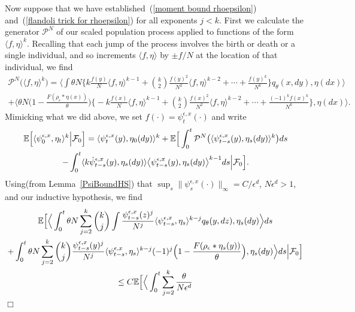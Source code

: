 \documentclass[12pt]{article}
\newenvironment {proof}{{\noindent\bf Proof }}{\hfill $\Box$ \medskip}
\newcommand{\IE}{\mathbb E}
\newcommand{\Pgen}{\mathcal{P}}    %
\numberwithin{equation}{section}
\begin{document}
\begin{proof}
Now suppose that we have established~(\ref{moment bound rhoepsilon}) 
and~(\ref{flandoli trick for rhoepsilon}) for all exponents $j<k$.
First we calculate the generator $\Pgen^N$ of our scaled population process applied
to functions of the form $\langle f,\eta\rangle^k$.
Recalling that each jump of the process involves the birth or death or a single 
individual, and so increments $\langle f,\eta\rangle$ by $\pm f/N$ at the location of
that individual, we find 
\begin{multline}
\label{pgen applied to kth moment}
\Pgen^N\Big(\langle f,\eta\rangle^k\Big)
=
\Big\langle
\int\theta N\Big\{k\frac{f(y)}{N}\langle f,\eta\rangle^{k-1}+
\binom{k}{2}\frac{f(y)^2}{N^2}\langle f,\eta\rangle^{k-2}+\cdots
+\frac{f(y)^{k}}{N^{k}}\Big\}q_\theta(x,dy),\eta(dx)\Big\rangle
\\
+
\Big\langle\theta N\Big(1-\frac{F(\rho_\epsilon*\eta(x))}{\theta}\Big)
\Big\{-k\frac{f(x)}{N}\langle f,\eta\rangle^{k-1}+
\binom{k}{2}\frac{f(x)^2}{N^2}\langle f,\eta\rangle^{k-2}+\cdots
+\frac{(-1)^{k}f(x)^{k}}{N^{k}}\Big\},\eta(dx)\Big\rangle.
\end{multline}
Mimicking what we did above, we set $f(\cdot)=\psi^{\epsilon,x}_t(\cdot)$ and 
write
\begin{multline}
\label{kth moment for time varying function}
\IE\Big[\langle \psi^{\epsilon,x}_0,\eta_t\rangle^k\Big|{\cal F}_0\Big]
=\langle\psi^{\epsilon, x}_t(y),\eta_0(dy)\rangle^k
+\IE\Big[\int_0^t\Pgen^N\big(\langle\psi^{\epsilon,x}_{t-s}(y),\eta_s(dy)\rangle^k\big) ds
\\
-\int_0^t\langle k\dot{\psi}^{\epsilon,x}_{t-s}(y), \eta_s(dy)\rangle
\big\langle \psi^{\epsilon, x}_{t-s}(y),\eta_s(dy)\big\rangle^{k-1}ds
\Big|{\cal F}_0\Big].
\end{multline}
Using(from Lemma~\ref{PsiBoundHS}) 
that $\sup_s\|\psi^{\epsilon,x}_s(\cdot)\|_\infty=C/\epsilon^d$,
$N\epsilon^d>1$,
and our inductive
hypothesis, we find
\begin{multline*}
\IE\Big[
\Big\langle
\int_0^t\theta N\sum_{j=2}^{k}\binom{k}{j}\int
\frac{\psi_{t-s}^{\epsilon,x}(z)^j}{N^j}
\langle \psi^{\epsilon,x}_{t-s},\eta_s\rangle^{k-j}
q_\theta(y,dz),
\eta_s(dy)\Big\rangle ds 
\\
+
\int_0^t\theta N\sum_{j=2}^{k}\binom{k}{j}\frac{\psi_{t-s}^{\epsilon,x}(y)^j}{N^j}\langle \psi^{\epsilon,x}_{t-s},\eta_s\rangle^{k-j}
(-1)^j\Big(1-\frac{F(\rho_\epsilon*\eta_s(y))}{\theta} 
\Big),
\eta_s(dy)\Big\rangle ds\Big|{\cal F}_0\Big]
\\
\leq 
C\IE\Big[\Big\langle\int_0^t\sum_{j=2}^k\frac{\theta}{N\epsilon^d}

\end{multline*}
\end{proof}
\end{document}
